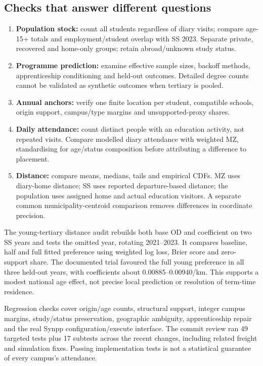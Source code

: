 \documentclass[11pt,a4paper]{article}
\begin{document}
\subsection{Checks that answer different questions}
\begin{enumerate}
\item \textbf{Population stock:} count all students regardless of diary visits;
compare age-15+ totals and employment/student overlap with SS 2023. Separate
private, recovered and home-only groups; retain abroad/unknown study status.
\item \textbf{Programme prediction:} examine effective sample sizes, backoff
methods, apprenticeship conditioning and held-out outcomes. Detailed degree
counts cannot be validated as synthetic outcomes when tertiary is pooled.
\item \textbf{Annual anchors:} verify one finite location per student, compatible
schools, origin support, campus/type margins and unsupported-proxy shares.
\item \textbf{Daily attendance:} count distinct people with an education activity,
not repeated visits. Compare modelled diary attendance with weighted MZ,
standardising for age/status composition before attributing a difference to placement.
\item \textbf{Distance:} compare means, medians, tails and empirical CDFs.
MZ uses diary-home distance; SS uses reported departure-based distance; the
population uses assigned home and actual education visitors. A separate common
municipality-centroid comparison removes differences in coordinate precision.
\end{enumerate}

The young-tertiary distance audit rebuilds both base OD and coefficient on two
SS years and tests the omitted year, rotating 2021--2023. It compares baseline,
half and full fitted preference using weighted log loss, Brier score and
zero-support share. The documented trial favoured the full young preference
in all three held-out years, with coefficients about 0.00885--0.00940/km.
This supports a modest national age effect, not precise local prediction or
resolution of term-time residence.

Regression checks cover origin/age counts, structural support, integer campus
margins, study/status preservation, geographic ambiguity, apprenticeship
repair and the real Synpp configuration/execute interface. The commit review
ran 49 targeted tests plus 17 subtests across the recent changes, including
related freight and simulation fixes. Passing implementation tests is not a
statistical guarantee of every campus's attendance.
\end{document}
